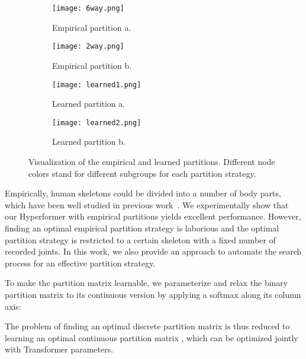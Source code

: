 \documentclass[10pt,twocolumn,letterpaper]{article}
\begin{document}
\begin{figure}[]
  \centering
\begin{subfigure}[t]{0.18\textwidth}
      \centering
      \texttt{[image: 6way.png]}
      \caption{Empirical partition a.}
      \label{fig: 2}
  \end{subfigure}
\hspace{1.5cm}
  \begin{subfigure}[t]{0.18\textwidth}
      \centering
      \texttt{[image: 2way.png]}
      \caption{Empirical partition b.}
      \label{fig:3}
  \end{subfigure}
  \hspace{0.6cm}
\begin{subfigure}[t]{0.18\textwidth}
      \centering
  \texttt{[image: learned1.png]}
      \caption{Learned partition a.}
      \label{fig:4}
  \end{subfigure}
        \hspace{1.5cm}
  \begin{subfigure}[t]{0.18\textwidth}
      \centering
  \texttt{[image: learned2.png]}
      \caption{Learned  partition b.}
      \label{fig:leg}
  \end{subfigure}
     \caption{Visualization of the empirical and learned partitions. Different node colors stand for different subgroups for each partition strategy.}
     \label{fig:2}
\end{figure}

Empirically, human skeletons could be divided into a number of body parts, which have been well studied in previous work~\cite{thakkar2018part, huang2020part, song2020stronger}.
We experimentally show that our Hyperformer with empirical partitions yields excellent performance. 
However, finding an optimal empirical partition strategy is laborious and the optimal partition strategy is restricted to a certain skeleton with a fixed number of recorded joints. In this work, we also provide an approach to automate the search process for an effective partition strategy.


To make the partition matrix learnable, we parameterize and relax the binary partition matrix to its continuous version by applying a softmax along its column axis:

The problem of finding an optimal discrete partition matrix  is thus reduced to learning an optimal continuous partition matrix , which can be optimized jointly with Transformer parameters. 
\end{document}

